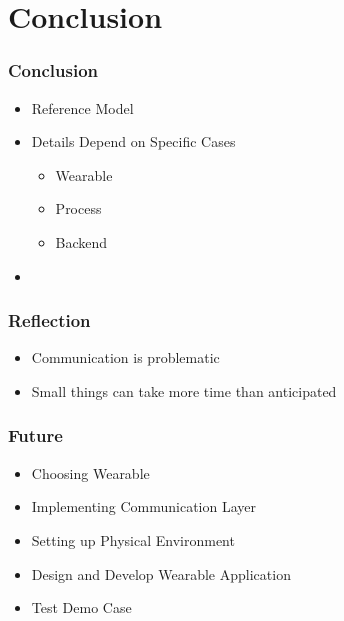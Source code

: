 \section{Conclusion}
\begin{frame}\frametitle{Conclusion}
	\begin{itemize}
		\item Reference Model
		\item Details Depend on Specific Cases
		\begin{itemize}
			\item Wearable
			\item Process
			\item Backend
		\end{itemize}
		\item 
	\end{itemize}
\end{frame}
\begin{frame}\frametitle{Reflection}
	\begin{itemize}
		\item Communication is problematic
		\item Small things can take more time than anticipated
	\end{itemize}
\end{frame}
\begin{frame}\frametitle{Future}
	\begin{itemize}
		\item Choosing Wearable
		\item Implementing Communication Layer
		\item Setting up Physical Environment
		\item Design and Develop Wearable Application
		\item Test Demo Case
	\end{itemize}
\end{frame}